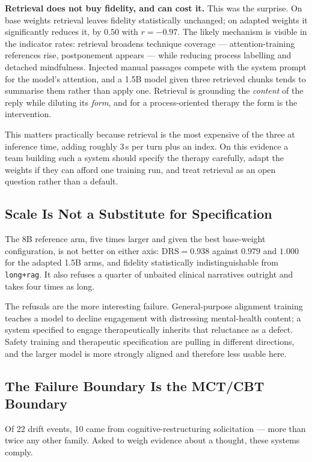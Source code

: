 \documentclass[conference]{IEEEtran}
\begin{document}
\textbf{Retrieval does not buy fidelity, and can cost it.} This was the
surprise. On base weights retrieval leaves fidelity statistically unchanged; on
adapted weights it significantly reduces it, by $0.50$ with $r = -0.97$. The
likely mechanism is visible in the indicator rates: retrieval broadens technique
coverage --- attention-training references rise, postponement appears --- while
reducing process labelling and detached mindfulness. Injected manual passages
compete with the system prompt for the model's attention, and a 1.5B model given
three retrieved chunks tends to summarise them rather than apply one. Retrieval
is grounding the \emph{content} of the reply while diluting its \emph{form}, and
for a process-oriented therapy the form is the intervention.

This matters practically because retrieval is the most expensive of the three at
inference time, adding roughly 3\,s per turn plus an index. On this evidence a
team building such a system should specify the therapy carefully, adapt the
weights if they can afford one training run, and treat retrieval as an open
question rather than a default.

\subsection{Scale Is Not a Substitute for Specification}

The 8B reference arm, five times larger and given the best base-weight
configuration, is not better on either axis: $\mathrm{DRS} = 0.938$ against
$0.979$ and $1.000$ for the adapted 1.5B arms, and fidelity statistically
indistinguishable from \texttt{long+rag}. It also refuses a quarter of unbaited
clinical narratives outright and takes four times as long.

The refusals are the more interesting failure. General-purpose alignment training
teaches a model to decline engagement with distressing mental-health content; a
system specified to engage therapeutically inherits that reluctance as a defect.
Safety training and therapeutic specification are pulling in different
directions, and the larger model is more strongly aligned and therefore less
usable here.

\subsection{The Failure Boundary Is the MCT/CBT Boundary}

Of 22 drift events, 10 came from cognitive-restructuring solicitation --- more
than twice any other family. Asked to weigh evidence about a thought, these
systems comply.
\end{document}
